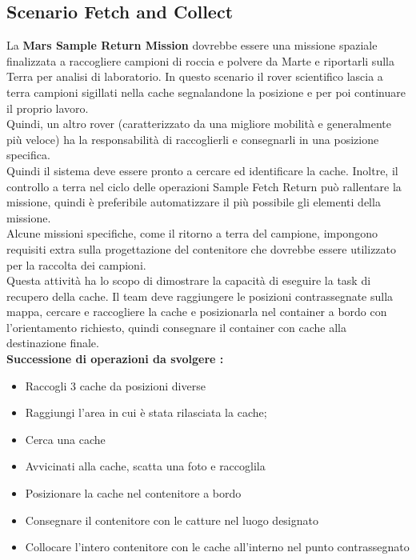 \documentclass[%
corpo=11pt,
twoside,
 stile=classica,
oldstyle,
greek,%
]{toptesi}
\begin{document}
		\subsection{Scenario Fetch and Collect}
		La \textbf{Mars Sample Return Mission} dovrebbe essere una missione spaziale finalizzata a raccogliere campioni di roccia e polvere da Marte e riportarli sulla Terra per analisi di laboratorio.
		In questo scenario il rover scientifico lascia a terra campioni sigillati nella cache segnalandone la posizione e per poi continuare il proprio lavoro. \\
		Quindi, un altro rover (caratterizzato da una migliore mobilità e generalmente più veloce) ha la responsabilità di raccoglierli e consegnarli in una posizione specifica. \\
		Quindi il sistema deve essere pronto a cercare ed identificare la cache. Inoltre, il controllo a terra nel ciclo delle operazioni Sample Fetch Return può rallentare la missione, quindi è preferibile automatizzare il più possibile gli elementi della missione.\\
		Alcune missioni specifiche, come il ritorno a terra del campione, impongono requisiti extra sulla progettazione del contenitore che dovrebbe essere utilizzato per la raccolta dei campioni.\\
		Questa attività ha lo scopo di dimostrare la capacità di eseguire la task di recupero della cache. Il team deve raggiungere le posizioni contrassegnate sulla mappa, cercare e raccogliere la cache e posizionarla nel container a bordo con l'orientamento richiesto, quindi consegnare il container con cache alla destinazione finale.\\
		\textbf{Successione di operazioni da svolgere :}
		\begin{itemize}
		\item Raccogli 3 cache da posizioni diverse
		\item Raggiungi l'area in cui è stata rilasciata la cache;
		\item Cerca una cache
		\item Avvicinati alla cache, scatta una foto e raccoglila  
		\item Posizionare la cache nel contenitore a bordo
		\item Consegnare il contenitore con le catture nel luogo designato
		\item Collocare l'intero contenitore con le cache all'interno nel punto contrassegnato
		\end{itemize}
		
\end{document}
